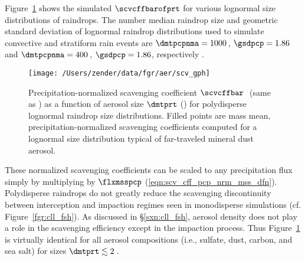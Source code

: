 \documentclass[12pt,twoside]{book}
\begin{document}
Figure~\ref{fgr:scv_cff_mss_nrm} shows the simulated $\scvcffbarofprt$ 
for various lognormal size distributions of raindrops.
The number median raindrop size and geometric standard deviation of 
lognormal raindrop distributions used to simulate convective and
stratiform rain events are $\dmtpcpnma = 1000$\,\um, $\gsdpcp = 1.86$
and $\dmtpcpnma = 400$\,\um, $\gsdpcp = 1.86$, respectively
\cite[]{NGD94}. 
\begin{figure*}
\begin{center}
\texttt{[image: /Users/zender/data/fgr/aer/scv\_gph]}\vfill
\end{center}
\caption[Scavenging coefficient for polydisperse raindrops]{
Precipitation-normalized scavenging coefficient 
$\scvcffbar$\,\xmm\ (same as \mSxkg) as a function of
aerosol size $\dmtprt$ (\um) for polydisperse lognormal raindrop size  
distributions.  
Filled points are mass mean, precipitation-normalized scavenging
coefficients computed for a lognormal size distribution typical of
far-traveled mineral dust aerosol.
\label{fgr:scv_cff_mss_nrm}}
\end{figure*}
These normalized scavenging coefficients can be scaled to any
precipitation flux simply by multiplying by $\flxmsspcp$
(\ref{eqn:scv_cff_pcp_nrm_mss_dfn}). 
Polydisperse raindrops do not greatly reduce the scavenging
discontinuity between interception and impaction regimes seen in
monodisperse simulations (cf. Figure~\ref{fgr:cll_fsh}).
As discussed in \S\ref{sxn:cll_fsh}, aerosol density does not play 
a role in the scavenging efficiency except in the impaction process. 
Thus Figure~\ref{fgr:scv_cff_mss_nrm} is virtually identical for all
aerosol compositions (i.e., sulfate, dust, carbon, and sea salt) for
sizes $\dmtprt \lesssim 2$\,\um.  
\end{document}
